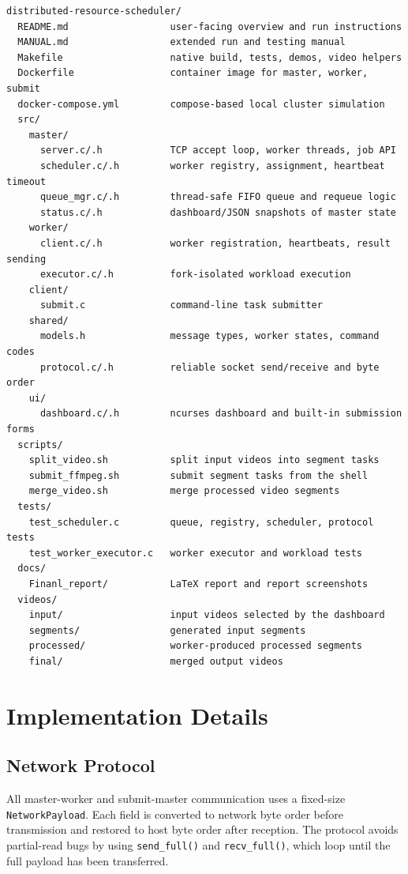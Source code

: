 \documentclass[12pt,a4paper]{article}
\begin{document}
\begin{lstlisting}[style=shellstyle]
distributed-resource-scheduler/
  README.md                  user-facing overview and run instructions
  MANUAL.md                  extended run and testing manual
  Makefile                   native build, tests, demos, video helpers
  Dockerfile                 container image for master, worker, submit
  docker-compose.yml         compose-based local cluster simulation
  src/
    master/
      server.c/.h            TCP accept loop, worker threads, job API
      scheduler.c/.h         worker registry, assignment, heartbeat timeout
      queue_mgr.c/.h         thread-safe FIFO queue and requeue logic
      status.c/.h            dashboard/JSON snapshots of master state
    worker/
      client.c/.h            worker registration, heartbeats, result sending
      executor.c/.h          fork-isolated workload execution
    client/
      submit.c               command-line task submitter
    shared/
      models.h               message types, worker states, command codes
      protocol.c/.h          reliable socket send/receive and byte order
    ui/
      dashboard.c/.h         ncurses dashboard and built-in submission forms
  scripts/
    split_video.sh           split input videos into segment tasks
    submit_ffmpeg.sh         submit segment tasks from the shell
    merge_video.sh           merge processed video segments
  tests/
    test_scheduler.c         queue, registry, scheduler, protocol tests
    test_worker_executor.c   worker executor and workload tests
  docs/
    Finanl_report/           LaTeX report and report screenshots
  videos/
    input/                   input videos selected by the dashboard
    segments/                generated input segments
    processed/               worker-produced processed segments
    final/                   merged output videos
\end{lstlisting}

\section{Implementation Details}

\subsection{Network Protocol}

All master-worker and submit-master communication uses a fixed-size \texttt{NetworkPayload}. Each field is converted to network byte order before transmission and restored to host byte order after reception. The protocol avoids partial-read bugs by using \texttt{send\_full()} and \texttt{recv\_full()}, which loop until the full payload has been transferred.
\end{document}
